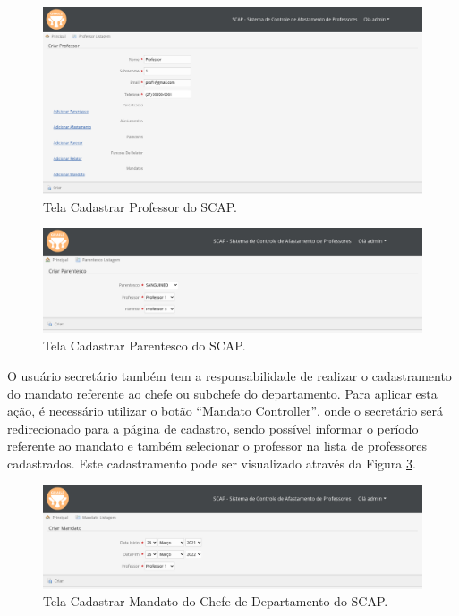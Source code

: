 \begin{figure}[h]
	\centering
	\includegraphics[scale=0.33]{figuras/fig-projeto-cadastrar-professor} 
	\caption{Tela Cadastrar Professor do SCAP.}
	\label{fig-projeto-cadastrar-professor}
\end{figure}

\begin{figure}[h]
	\centering
	\includegraphics[scale=0.33]{figuras/fig-projeto-cadastrar-parentesco} 
	\caption{Tela Cadastrar Parentesco do SCAP.}
	\label{fig-projeto-cadastrar-parentesco}
\end{figure}

O usuário secretário também tem a responsabilidade de realizar o cadastramento do mandato referente ao chefe ou subchefe do departamento. Para aplicar esta ação, é necessário utilizar o botão ``Mandato Controller'', onde o secretário será redirecionado para a página de cadastro, sendo possível informar o período referente ao mandato e também selecionar o professor na lista de professores cadastrados. Este cadastramento pode ser visualizado através da Figura \ref{fig-projeto-cadastrar-mandato}. 

\begin{figure}[h]
	\centering
	\includegraphics[scale=0.33]{figuras/fig-projeto-cadastrar-mandato} 
	\caption{Tela Cadastrar Mandato do Chefe de Departamento do SCAP.}
	\label{fig-projeto-cadastrar-mandato}
\end{figure}

